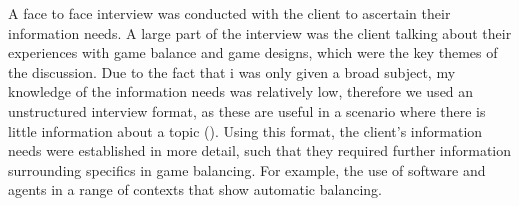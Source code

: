 
A face to face interview was conducted with the client to ascertain their information needs. A large part of the interview was the client talking about their experiences with game balance and game designs, which were the key themes of the discussion. Due to the fact that i was only given a broad subject, my knowledge of the information needs was relatively low, therefore we used an unstructured interview format, as these are useful in a scenario where there is little information about a topic (\cite{easwaramoorthy2006interviewing}). Using this format, the client's information needs were established in more detail, such that they required further information surrounding specifics in game balancing. For example, the use of software and agents in a range of contexts that show automatic balancing.


